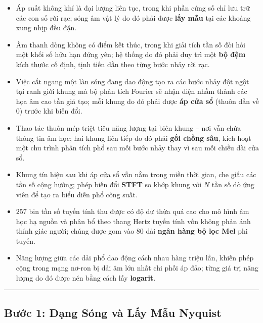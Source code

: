 \documentclass[11pt,a4paper]{article}
\begin{document}
{\footnotesize
\begin{itemize}\setlength{\itemsep}{-2.5pt}\setlength{\parsep}{0pt}\setlength{\topsep}{0pt}\setlength{\partopsep}{0pt}
    \item Áp suất không khí là đại lượng liên tục, trong khi phần cứng số chỉ lưu trữ các con số rời rạc; sóng âm vật lý do đó phải được \textbf{lấy mẫu} tại các khoảng xung nhịp đều đặn.
    \item Âm thanh dòng không có điểm kết thúc, trong khi giải tích tần số đòi hỏi một khối số hữu hạn đứng yên; hệ thống do đó phải duy trì một \textbf{bộ đệm} kích thước cố định, tịnh tiến dần theo từng bước nhảy rời rạc.
    \item Việc cắt ngang một làn sóng đang dao động tạo ra các bước nhảy đột ngột tại ranh giới khung mà bộ phân tích Fourier sẽ nhận diện nhầm thành các họa âm cao tần giả tạo; mỗi khung do đó phải được \textbf{áp cửa sổ} (thuôn dần về 0) trước khi biến đổi.
    \item Thao tác thuôn mép triệt tiêu năng lượng tại biên khung -- nơi vẫn chứa thông tin âm học; hai khung liên tiếp do đó phải \textbf{gối chồng sâu}, kích hoạt một chu trình phân tích phổ sau mỗi bước nhảy thay vì sau mỗi chiều dài cửa sổ.
    \item Khung tín hiệu sau khi áp cửa sổ vẫn nằm trong miền thời gian, che giấu các tần số cộng hưởng; phép biến đổi \textbf{STFT} so khớp khung với $N$ tần số dò ứng viên để tạo ra biểu diễn phổ công suất.
    \item $257$ bin tần số tuyến tính thu được có độ dư thừa quá cao cho mô hình âm học hạ nguồn và phân bổ theo thang Hertz tuyến tính vốn không phản ánh thính giác người; chúng được gom vào $80$ dải \textbf{ngân hàng bộ lọc Mel} phi tuyến.
    \item Năng lượng giữa các dải phổ dao động cách nhau hàng triệu lần, khiến phép cộng trong mạng nơ-ron bị dải âm lớn nhất chi phối áp đảo; từng giá trị năng lượng do đó được nén bằng cách lấy \textbf{logarit}.
\end{itemize}
}

\vspace{0.3mm}
\hrule
\vspace{0.3mm}

\vspace{-2.5mm}
\subsection*{Bước 1: Dạng Sóng và Lấy Mẫu Nyquist}
\vspace{-1.5mm}
\end{document}
